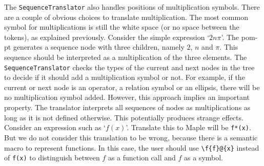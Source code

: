 \documentclass[a4paper,11pt]{article}
\newcommand{\Maple}{Maple}
\theoremstyle{defTheoStyle}
\theoremstyle{defExampStyle}
\begin{document}
The \verb|SequenceTranslator| also handles positions of multiplication symbols. There are a couple of obvious choices to translate multiplication. The most common symbol for multiplications is still the white space (or no space between the tokens), as explained previously. Consider the simple expression `$2n\pi$'. The \gls*{pom-pt} generates a sequence node with three children, namely $2$, $n$ and $\pi$. This sequence should be interpreted as a multiplication of the three elements. The \verb|SequenceTranslator| checks the types of the current and next nodes in the tree to decide if it should add a multiplication symbol or not. For example, if the current or next node is an operator, a relation symbol or an ellipsis, there will be no multiplication symbol added. However, this approach implies an important property. The translator interprets all sequences of nodes as multiplications as long as it is not defined otherwise. This potentially produces strange effects. Consider an expression such as `$f(x)$'. Translate this to \Maple{} will be \verb|f*(x)|. But we do not consider this translation to be wrong, because there is a semantic macro to represent functions. In this case, the user should use \verb|\f{f}@{x}| instead of \verb|f(x)| to distinguish between $f$ as a function call and $f$ as a symbol.
\end{document}
